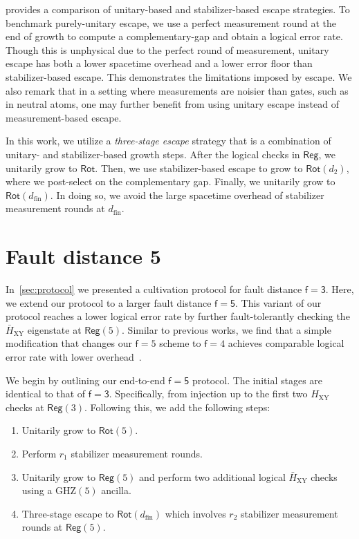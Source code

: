 \documentclass[%
    aps, 
    physrev,
    reprint,
]{revtex4-2}
\newcommand{\fd}[1]{\mathsf{f}=#1}
\newcommand{\rot}[1]{\mathsf{Rot}(#1)}
\newcommand{\reg}[1]{\mathsf{Reg}(#1)}
\newcommand{\GHZ}[1]{\text{GHZ}(#1)}
\newcommand{\XY}{_\mathrm{XY}}
\newcommand{\fin}{_\mathrm{fin}}
\begin{document}
 provides a comparison of unitary-based and stabilizer-based escape strategies.
To benchmark purely-unitary escape, we use a perfect measurement round at the end of growth to compute a complementary-gap and obtain a logical error rate. 
Though this is unphysical due to the perfect round of measurement, unitary escape has both a lower spacetime overhead and a lower error floor than stabilizer-based escape.
This demonstrates the limitations imposed by escape.
We also remark that in a setting where measurements are noisier than gates, such as in neutral atoms, one may further benefit from using unitary escape instead of measurement-based escape.


In this work, we utilize a \textit{three-stage escape} strategy that is a combination of unitary- and stabilizer-based growth steps.
After the logical checks in $\mathsf{Reg}$, we unitarily grow to $\mathsf{Rot}$.
Then, we use stabilizer-based escape to grow to $\rot{d_2}$, where we post-select on the complementary gap.
Finally, we unitarily grow to $\rot{d\fin}$. 
In doing so, we avoid the large spacetime overhead of stabilizer measurement rounds at $d\fin$.

\section{Fault distance 5}\label{app:fd5}

In~\cref{sec:protocol} we presented a cultivation protocol for fault distance $\mathsf{f=3}$. 
Here, we extend our protocol to a larger fault distance $\mathsf{f=5}$. 
This variant of our
protocol reaches a lower logical error rate by further fault-tolerantly checking the $\bar{H}\XY$ eigenstate at $\reg{5}$.  
Similar to previous works, we find that a simple modification that changes our $\fd5$ scheme to $\fd 4$ achieves comparable logical error rate with lower overhead~\cite{gidney2024magic}. 

We begin by outlining our end-to-end $\mathsf{f=5}$ protocol. 
The initial stages 
are identical to that of $\mathsf{f=3}$.
Specifically, from injection up to the first two $H\XY$ checks at $\reg3$. 
Following this,
we add the following steps: 
\begin{enumerate}
    \item Unitarily grow to $\rot5$.
    \item Perform $r_1$ stabilizer measurement rounds.
    \item Unitarily grow to $\reg{5}$ and perform two additional logical $\bar{H}\XY$ checks using a $\GHZ{5}$ ancilla.
    \item Three-stage escape to $\rot{d\fin}$ which involves $r_2$ stabilizer measurement rounds at $\reg{5}$.
\end{enumerate}
\end{document}
